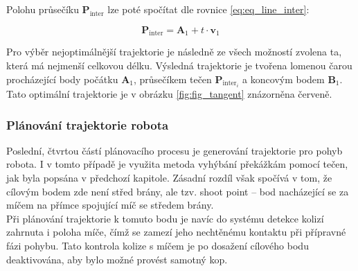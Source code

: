 \documentclass[a4paper,12pt]{article}
\begin{document}
Polohu průsečíku $\mathbf{P}_{\text{inter}}$ lze poté spočítat dle rovnice \ref{eq:eq_line_inter}:

\begin{equation}
	\mathbf{P}_{\text{inter}} = \mathbf{A}_1 + t \cdot \mathbf{v}_1
	\label{eq:eq_line_inter}
\end{equation}

Pro výběr nejoptimálnější trajektorie je následně ze všech možností zvolena ta, která má nejmenší celkovou délku. Výsledná trajektorie je tvořena lomenou čarou procházející body počátku $\mathbf{A}_1$, průsečíkem tečen $\mathbf{P}_{\text{inter}_i}$ a koncovým bodem $\mathbf{B}_1$. Tato optimální trajektorie je v obrázku \ref{fig:fig_tangent} znázorněna červeně.

\subsubsection{Plánování trajektorie robota}

Poslední, čtvrtou částí plánovacího procesu je generování trajektorie pro pohyb robota. I v tomto případě je využita metoda vyhýbání překážkám pomocí tečen, jak byla popsána v předchozí kapitole. Zásadní rozdíl však spočívá v tom, že cílovým bodem zde není střed brány, ale tzv. shoot point – bod nacházející se za míčem na přímce spojující míč se středem brány.\\

Při plánování trajektorie k tomuto bodu je navíc do systému detekce kolizí zahrnuta i poloha míče, čímž se zamezí jeho nechtěnému kontaktu při přípravné fázi pohybu. Tato kontrola kolize s míčem je po dosažení cílového bodu deaktivována, aby bylo možné provést samotný kop.
\end{document}
